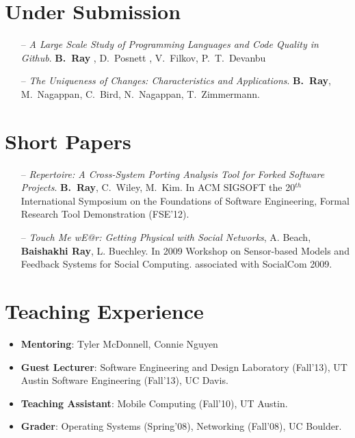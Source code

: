 \documentclass[overlapped,line,letterpaper, 12pt]{res}
\begin{document}
\begin{resume}
\section{\small Under Submission}

\begin{itemize}
\item[--]
{\em A Large Scale Study of Programming Languages and Code Quality in Github}. 
{\bf B.~Ray} , D.~Posnett , V.~Filkov, P.~T.~Devanbu 


\item[--]
{\em The Uniqueness of Changes: Characteristics and Applications}. 
{\bf B.~Ray}, M.~Nagappan, C.~Bird, N.~Nagappan, T.~Zimmermann.

\end{itemize}

\section{\small Short Papers}

\begin{itemize}
\item[--]
{\em Repertoire: A Cross-System Porting Analysis Tool for Forked Software Projects}. 
{\bf B.~Ray}, C.~Wiley, M.~Kim.
{\small In ACM SIGSOFT the 20$^{th}$ International Symposium on the Foundations of Software Engineering, Formal Research Tool Demonstration (FSE'12).}

\item[--]
{\em Touch Me wE@r: Getting Physical with Social Networks},
A. Beach, {\bf Baishakhi Ray}, L. Buechley. 
{\small In 2009 Workshop on Sensor-based Models and Feedback Systems for Social Computing. associated with SocialCom 2009.}
\end{itemize}

\section{\bf Teaching Experience}
\vspace{1cm}
\begin{itemize}
\item
{\bf Mentoring}: Tyler McDonnell, Connie Nguyen
\item
{\bf Guest Lecturer}: Software Engineering and Design Laboratory (Fall'13), UT Austin
                                 Software Engineering (Fall'13), UC Davis.
\item 
{\bf Teaching Assistant}: Mobile Computing (Fall'10), UT Austin.
\item
{\bf Grader}: Operating Systems (Spring'08), Networking (Fall'08), UC Boulder.
\end{itemize}


\end{resume}
\end{document}
